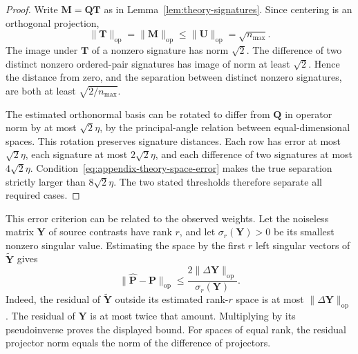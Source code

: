 \begin{proof}
    Write $\mathbf M=\mathbf Q\mathbf T$ as in
    Lemma~\ref{lem:theory-signatures}.
    Since centering is an orthogonal projection,
    \begin{equation*}
        \|\mathbf T\|_{\mathrm{op}}
        =\|\mathbf M\|_{\mathrm{op}}
        \le\|\mathbf U\|_{\mathrm{op}}
        =\sqrt{n_{\max}}.
    \end{equation*}
    The image under $\mathbf T$ of a nonzero signature has norm
    $\sqrt2$. The difference of two distinct nonzero ordered-pair
    signatures has image of norm at least $\sqrt2$.
    Hence the distance from zero, and the separation between
    distinct nonzero signatures, are both at least
    $\sqrt{2/n_{\max}}$.

    The estimated orthonormal basis can be rotated to differ from
    $\mathbf Q$ in operator norm by at most
    $\sqrt2\eta$, by the principal-angle relation
    between equal-dimensional spaces.
    This rotation preserves signature distances.
    Each row has error at most $\sqrt2\eta$, each signature at most
    $2\sqrt2\eta$, and each difference of two signatures at most $4\sqrt2\eta$.
    Condition~\eqref{eq:appendix-theory-space-error} makes the true
    separation strictly larger than $8\sqrt2\eta$.
    The two stated thresholds therefore separate all required cases.
\end{proof}

This error criterion can be related to the observed weights.
Let the noiseless matrix $\mathbf Y$ of source contrasts have rank
$r$, and let $\sigma_r(\mathbf Y)>0$ be its smallest nonzero singular value.
Estimating the space by the first $r$ left singular vectors of
$\widetilde{\mathbf Y}$ gives
\begin{equation}
    \|\widehat{\mathbf P}-\mathbf P\|_{\mathrm{op}}
    \le\frac{2\|\Delta\mathbf Y\|_{\mathrm{op}}}
             {\sigma_r(\mathbf Y)}.
    \label{eq:appendix-theory-subspace-perturbation}
\end{equation}
Indeed, the residual of $\widetilde{\mathbf Y}$ outside its
estimated rank-$r$ space is at most $\|\Delta\mathbf Y\|_{\mathrm{op}}$.
The residual of $\mathbf Y$ is at most twice that amount.
Multiplying by its pseudoinverse proves the displayed bound.
For spaces of equal rank, the residual projector norm equals
the norm of the difference of projectors.

